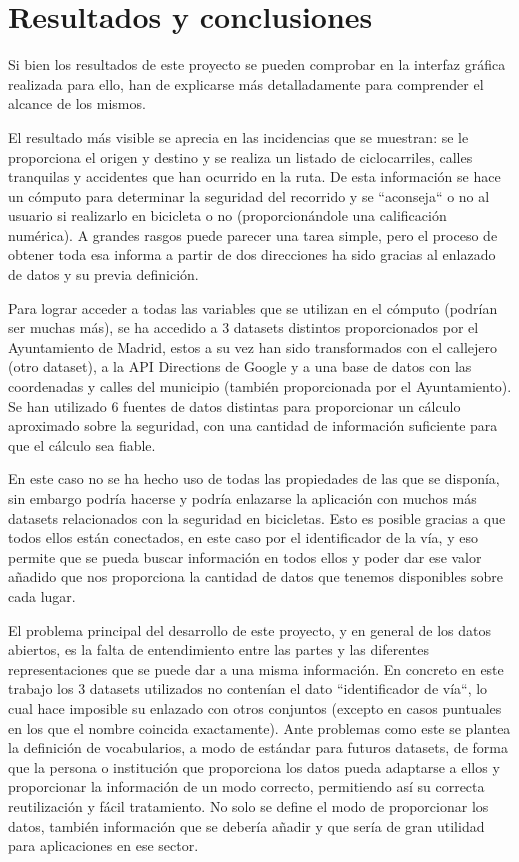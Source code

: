\chapter{Resultados y conclusiones}

Si bien los resultados de este proyecto se pueden comprobar en la interfaz gráfica realizada para ello, han de explicarse más detalladamente para comprender el alcance de los mismos.

El resultado más visible se aprecia en las incidencias que se muestran: se le proporciona el origen y destino y se realiza un listado de ciclocarriles, calles tranquilas y accidentes que han ocurrido en la ruta. De esta información se hace un cómputo para determinar la seguridad del recorrido y se ``aconseja`` o no al usuario si realizarlo en bicicleta o no (proporcionándole una calificación numérica). A grandes rasgos puede parecer una tarea simple, pero el proceso de obtener toda esa informa a partir de dos direcciones ha sido gracias al enlazado de datos y su previa definición.

Para lograr acceder a todas las variables que se utilizan en el cómputo (podrían ser muchas más), se ha accedido a 3 datasets distintos proporcionados por el Ayuntamiento de Madrid, estos a su vez han sido transformados con el callejero (otro dataset), a la API Directions de Google y a una base de datos con las coordenadas y calles del municipio (también proporcionada por el Ayuntamiento). Se han utilizado 6 fuentes de datos distintas para proporcionar un cálculo aproximado sobre la seguridad, con una cantidad de información suficiente para que el cálculo sea fiable.

En este caso no se ha hecho uso de todas las propiedades de las que se disponía, sin embargo podría hacerse y podría enlazarse la aplicación con muchos más datasets relacionados con la seguridad en bicicletas. Esto es posible gracias a que todos ellos están conectados, en este caso por el identificador de la vía, y eso permite que se pueda buscar información en todos ellos y poder dar ese valor añadido que nos proporciona la cantidad de datos que tenemos disponibles sobre cada lugar.

El problema principal del desarrollo de este proyecto, y en general de los datos abiertos, es la falta de entendimiento entre las partes y las diferentes representaciones que se puede dar a una misma información. En concreto en este trabajo los 3 datasets utilizados no contenían el dato ``identificador de vía``, lo cual hace imposible su enlazado con otros conjuntos (excepto en casos puntuales en los que el nombre coincida exactamente). Ante problemas como este se plantea la definición de vocabularios, a modo de estándar para futuros datasets, de forma que la persona o institución que proporciona los datos pueda adaptarse a ellos y proporcionar la información de un modo correcto, permitiendo así su correcta reutilización y fácil tratamiento. No solo se define el modo de proporcionar los datos, también información que se debería añadir y que sería de gran utilidad para aplicaciones en ese sector.

